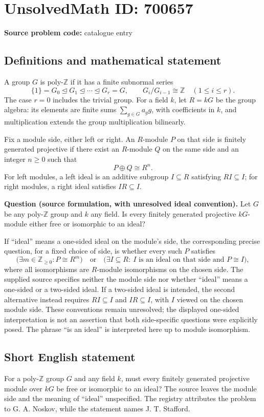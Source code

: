 \documentclass[11pt]{article}
\newcommand{\Z}{\mathbb{Z}}
\begin{document}
\section*{UnsolvedMath ID: 700657}
\textbf{Source problem code:} catalogue entry
\subsection{Definitions and mathematical statement}
A group \(G\) is poly-\(\Z\) if it has a finite subnormal series
\[
\{1\}=G_0\trianglelefteq G_1\trianglelefteq\cdots\trianglelefteq G_r=G,
\qquad G_i/G_{i-1}\cong\Z\quad(1\leq i\leq r).
\]
The case \(r=0\) includes the trivial group. For a field \(k\), let \(R=kG\) be the group algebra: its elements are finite sums \(\sum_{g\in G}a_g g\), with coefficients in \(k\), and multiplication extends the group multiplication bilinearly.

Fix a module side, either left or right. An \(R\)-module \(P\) on that side is finitely generated projective if there exist an \(R\)-module \(Q\) on the same side and an integer \(n\geq0\) such that
\[
P\oplus Q\cong R^n.
\]
For left modules, a left ideal is an additive subgroup \(I\subseteq R\) satisfying \(RI\subseteq I\); for right modules, a right ideal satisfies \(IR\subseteq I\).

\textbf{Question (source formulation, with unresolved ideal convention).} Let \(G\) be any poly-\(\Z\) group and \(k\) any field. Is every finitely generated projective \(kG\)-module either free or isomorphic to an ideal?

If ``ideal'' means a one-sided ideal on the module's side, the corresponding precise question, for a fixed choice of side, is whether every such \(P\) satisfies
\[
\bigl(\exists m\in\Z_{\geq0}: P\cong R^m\bigr)
\quad\text{or}\quad
\bigl(\exists I\subseteq R:\ I\text{ is an ideal on that side and }P\cong I\bigr),
\]
where all isomorphisms are \(R\)-module isomorphisms on the chosen side. The supplied source specifies neither the module side nor whether ``ideal'' means a one-sided or a two-sided ideal. If a two-sided ideal is intended, the second alternative instead requires \(RI\subseteq I\) and \(IR\subseteq I\), with \(I\) viewed on the chosen module side. These conventions remain unresolved; the displayed one-sided interpretation is not an assertion that both side-specific questions were explicitly posed. The phrase ``is an ideal'' is interpreted here up to module isomorphism.
\subsection{Short English statement}
For a poly-\(\Z\) group \(G\) and any field \(k\), must every finitely generated projective module over \(kG\) be free or isomorphic to an ideal? The source leaves the module side and the meaning of ``ideal'' unspecified. The registry attributes the problem to G. A. Noskov, while the statement names J. T. Stafford.
\end{document}
